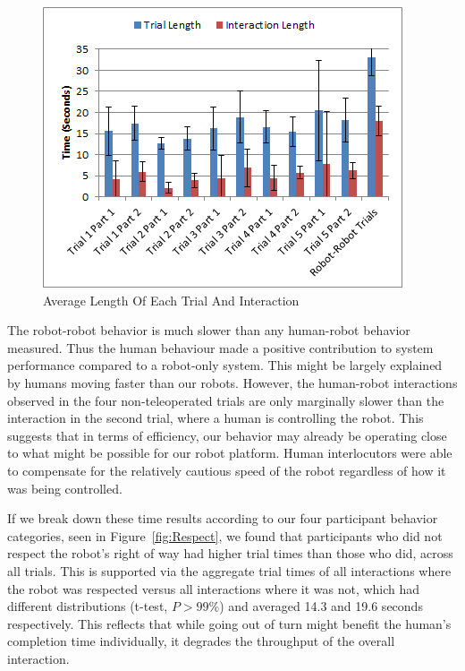 \documentclass[letterpaper, 10 pt, conference]{ieeeconf}  %
\begin{document}
   
        \begin{figure}
      \centering
      \includegraphics{Interaction_Trial.png}
      \caption{Average Length Of Each Trial And Interaction}
      \label{fig:Trial_Interaction}
   \end{figure}

The robot-robot behavior is much slower than any human-robot behavior measured. Thus the human behaviour made a positive contribution to system performance compared to a robot-only system. This might be largely explained by  humans moving faster than our robots. However, the human-robot interactions observed in the four non-teleoperated trials are only marginally slower than the interaction in the second trial, where a human is controlling the robot. This suggests that in terms of efficiency, our behavior may already be operating close to what might be possible for our robot platform. Human interlocutors were able to compensate for the relatively cautious speed of the robot regardless of how it was being controlled. 

If we break down these time results according to our four participant behavior categories, seen in Figure~\ref{fig:Respect}, we found that participants who did not respect the robot's right of way had higher trial times than those who did, across all trials. This is supported via the aggregate trial times of all interactions where the robot was respected versus all interactions where it was not, which had different distributions  (t-test, $P > 99\%$) and averaged 14.3 and 19.6 seconds respectively. This reflects that while going out of turn might benefit the human's completion time individually, it degrades the throughput of the overall interaction. 
\end{document}
